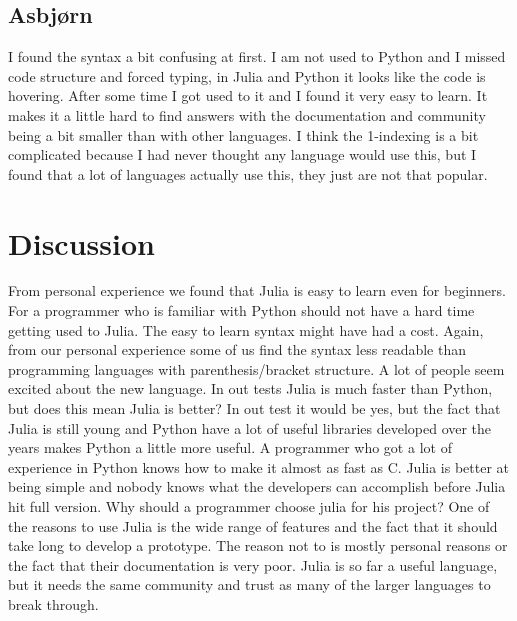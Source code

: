 \documentclass[a4paper, 11pt, titlepage]{article}
\begin{document}
\subsection{Asbjørn}
I found the syntax a bit confusing at first. I am not used to Python and I missed code structure and forced typing, in Julia and Python it looks like the code is hovering. After some time I got used to it and I found it very easy to learn. It makes it a little hard to find answers with the documentation and community being a bit smaller than with other languages. I think the 1-indexing is a bit complicated because I had never thought any language would use this, but I found that a lot of languages actually use this, they just are not that popular.

\section{Discussion}
From personal experience we found that Julia is easy to learn even for beginners. For a programmer who is familiar with Python should not have a hard time getting used to Julia. The easy to learn syntax might have had a cost. Again, from our personal experience some of us find the syntax less readable than programming languages with parenthesis/bracket structure. A lot of people seem excited about the new language. 
In out tests Julia is much faster than Python, but does this mean Julia is better? In out test it would be yes, but the fact that Julia is still young and Python have a lot of useful libraries developed over the years makes Python a little more useful. A programmer who got a lot of experience in Python knows how to make it almost as fast as C. Julia is better at being simple and nobody knows what the developers can accomplish before Julia hit full version.
Why should a programmer choose julia for his project? One of the reasons to use Julia is the wide range of features and the fact that it should take long to develop a prototype. The reason not to is mostly personal reasons or the fact that their documentation is very poor. Julia is so far a useful language, but it needs the same community and trust as many of the larger languages to break through.
 
\end{document}
